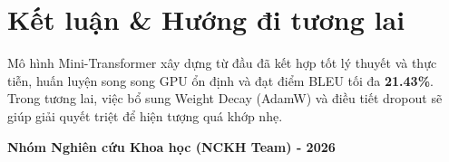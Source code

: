 \documentclass[12pt,a4paper]{report}
\begin{document}
\chapter{Kết luận \& Hướng đi tương lai}

Mô hình Mini-Transformer xây dựng từ đầu đã kết hợp tốt lý thuyết và thực tiễn, huấn luyện song song GPU ổn định và đạt điểm BLEU tối đa \textbf{21.43\%}. Trong tương lai, việc bổ sung Weight Decay (AdamW) và điều tiết dropout sẽ giúp giải quyết triệt để hiện tượng quá khớp nhẹ.

\vspace{1.5cm}
\begin{flushright}
    \textbf{Nhóm Nghiên cứu Khoa học (NCKH Team) - 2026}
\end{flushright}
\end{document}
